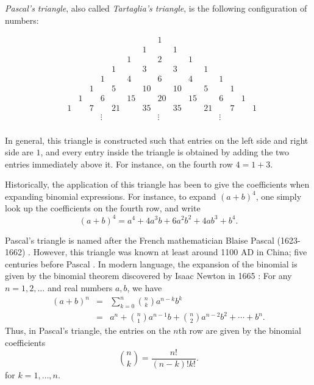\documentclass[12pt]{article}
\begin{document}
\emph{Pascal's triangle}, also called \emph{Tartaglia's triangle}, is the following configuration of numbers:

\[
\begin{array}{cccccccccccccccccc}
&   &   &   &   &   &   &   &   & 1 &   &   &   &   &   &   &   &\\ 
&   &   &   &   &   &   &   & 1 &   & 1 &   &   &   &   &   &   &\\ 
&   &   &   &   &   &   & 1 &   & 2 &   & 1 &   &   &   &   &   &\\ 
&   &   &   &   &   & 1 &   & 3 &   & 3 &   & 1 &   &   &   &   &\\ 
&   &   &   &   & 1 &   & 4 &   & 6 &   & 4 &   & 1 &   &   &   &\\ 
&   &   &   & 1 &   & 5 &   &10 &   &10 &   & 5 &   & 1 &   &   &\\ 
&   &   & 1 &   & 6 &   &15 &   & 20&   &15 &   & 6 &   & 1 &   &\\ 
&   & 1 &   & 7 &   &21 &   &35 &   &35 &   &21 &   & 7 &   & 1 &\\ 
&  & & & &\vdots & &   &  & \vdots & & & &  \vdots&  & & & \\ 
 \end{array}
\]

In general, this triangle is constructed such that entries 
on the left side and right side 
are $1$, and every entry inside the triangle is obtained by 
adding the two entries immediately above it. For instance,
on the fourth row $4=1+3$.

Historically, the application of this triangle has been to give 
the coefficients when expanding binomial expressions. For instance,
to expand $(a+b)^4$, one simply look up the 
coefficients on the fourth row, and write
$$(a+b)^4 = a^4 + 4 a^3 b + 6 a^2 b^2 + 4 a b^3 + b^4.$$

Pascal's triangle is named after the French mathematician
Blaise Pascal (1623-1662) \cite{wikipascal}. 
However, this triangle was known at least 
around 1100 AD in China; five centuries before Pascal
\cite{wikibinom}. In modern language, the expansion 
of the binomial is given by 
the binomial theorem discovered by Isaac Newton 
in 1665 \cite{wikinewton}: For any $n=1,2,\ldots$ and real numbers $a,b$, we 
have 
\begin{eqnarray*}
(a+b)^n &=& \sum_{k=0}^n \binom{n}{k} a^{n-k}b^k \\
 &=& a^n + \binom{n}{1} a^{n-1}b + \binom{n}{2} a^{n-2}b^2 + \cdots + b^n. 
\end{eqnarray*}
Thus, in Pascal's triangle, the entries on the $n$th row are given by
the binomial coefficients 
$$\binom{n}{k}=\frac{n!}{(n-k)!k!}.$$
for $k=1,\ldots, n$. 
\end{document}
